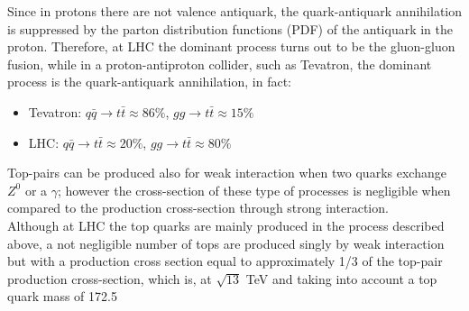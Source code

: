\newline Since in protons there are not valence antiquark, the quark-antiquark annihilation is suppressed by 
the parton distribution functions (PDF) of the antiquark in the proton. Therefore, at LHC the dominant process turns out to be the
gluon-gluon fusion, while in a proton-antiproton collider, such as Tevatron,
the dominant process is the quark-antiquark annihilation, in fact:
\begin{itemize}
	\item Tevatron: $q\bar{q}\rightarrow t\bar{t} \approx 86\%$, $gg\rightarrow t\bar{t} \approx 15\%$
	\item LHC: $q\bar{q}\rightarrow t\bar{t} \approx 20\%$, $gg\rightarrow t\bar{t} \approx 80\%$
\end{itemize}
Top-pairs can be produced also for weak interaction when two quarks exchange $Z^0$ or a $\gamma$; however the cross-section of these
type of processes is negligible when compared to the production cross-section through strong interaction.\\
Although at LHC the top quarks are mainly produced in the process described above, a not negligible number of tops 
are produced singly by weak interaction but with a production cross section equal to approximately 1/3 of the top-pair production
cross-section, which is, at $\sqrt{13}$ TeV and taking into account a top quark mass of 172.5 \\


